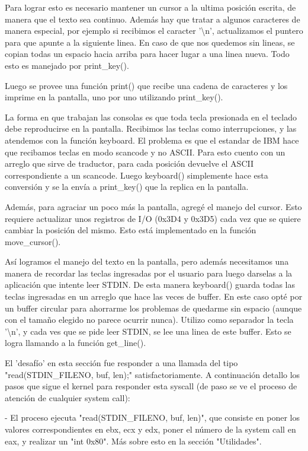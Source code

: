 Para lograr esto es necesario mantener un cursor a la ultima posición escrita,
de manera que el texto sea continuo. Además hay que tratar a algunos caracteres
de manera especial, por ejemplo si recibimos el caracter '\textbackslash n',
actualizamos el puntero para que apunte a la siguiente linea. En caso de que
nos quedemos sin lineas, se copian todas un espacio hacia arriba para hacer
lugar a una linea nueva. Todo esto es manejado por print\_key().

Luego se provee una función print() que recibe una cadena de caracteres y los
imprime en la pantalla, uno por uno utilizando print\_key().

La forma en que trabajan las consolas es que toda tecla presionada en el
teclado debe reproducirse en la pantalla. Recibimos las teclas como
interrupciones, y las atendemos con la función keyboard. El problema es que el
estandar de IBM hace que recibamos teclas en modo scancode y no ASCII. Para
esto cuento con un arreglo que sirve de traductor, para cada posición devuelve
el ASCII correspondiente a un scancode. Luego keyboard() simplemente hace esta
conversión y se la envía a print\_key() que la replica en la pantalla.

Además, para agraciar un poco más la pantalla, agregé el manejo del cursor.
Esto requiere actualizar unos registros de I/O (0x3D4 y 0x3D5) cada vez que se
quiere cambiar la posición del mismo. Esto está implementado en la función
move\_cursor().

Así logramos el manejo del texto en la pantalla, pero además necesitamos una
manera de recordar las teclas ingresadas por el usuario para luego darselas a
la aplicación que intente leer STDIN. De esta manera keyboard() guarda todas
las teclas ingresadas en un arreglo que hace las veces de buffer. En este caso
opté por un buffer circular para ahorrarme los problemas de quedarme sin
espacio (aunque con el tamaño elegido no parece ocurrir nunca). Utilizo como
separador la tecla '\textbackslash n', y cada ves que se pide leer STDIN, se
lee una linea de este buffer. Esto se logra llamando a la función get\_line().

El 'desafío' en esta sección fue responder a una llamada del tipo
"read(STDIN\_FILENO, buf, len);" satisfactoriamente. A continuación detallo los
pasos que sigue el kernel para responder esta syscall (de paso se ve el proceso
de atención de cualquier system call):

- El proceso ejecuta "read(STDIN\_FILENO, buf, len)", que consiste en poner los
valores correspondientes en ebx, ecx y edx, poner el número de la system call
en eax, y realizar un "int 0x80". Más sobre esto en la sección "Utilidades".

